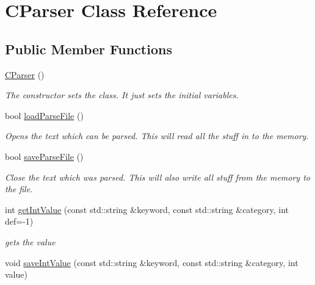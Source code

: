 \hypertarget{class_c_parser}{
\section{CParser Class Reference}
\label{class_c_parser}
}
\subsection*{Public Member Functions}
\begin{DoxyCompactItemize}
\item 
\hypertarget{class_c_parser_aa6372ef4dbf7d11dc4c51f4f4abd1750}{
\hyperlink{class_c_parser_aa6372ef4dbf7d11dc4c51f4f4abd1750}{CParser} ()}
\label{class_c_parser_aa6372ef4dbf7d11dc4c51f4f4abd1750}

\begin{DoxyCompactList}\small\item\em The constructor sets the class. It just sets the initial variables. \item\end{DoxyCompactList}\item 
bool \hyperlink{class_c_parser_a0b7c44198349162fd944a285d164a57c}{loadParseFile} ()
\begin{DoxyCompactList}\small\item\em Opens the text which can be parsed. This will read all the stuff in to the memory. \item\end{DoxyCompactList}\item 
bool \hyperlink{class_c_parser_af67215748daabe83cd0682a443e2fe36}{saveParseFile} ()
\begin{DoxyCompactList}\small\item\em Close the text which was parsed. This will also write all stuff from the memory to the file. \item\end{DoxyCompactList}\item 
int \hyperlink{class_c_parser_a702bc37d242fade03f3b797417872514}{getIntValue} (const std::string \&keyword, const std::string \&category, int def=-\/1)
\begin{DoxyCompactList}\small\item\em gets the value \item\end{DoxyCompactList}\item 
void \hyperlink{class_c_parser_a55aa335048e89a9758b87e8ed8be14ce}{saveIntValue} (const std::string \&keyword, const std::string \&category, int value)

\end{DoxyCompactItemize}
